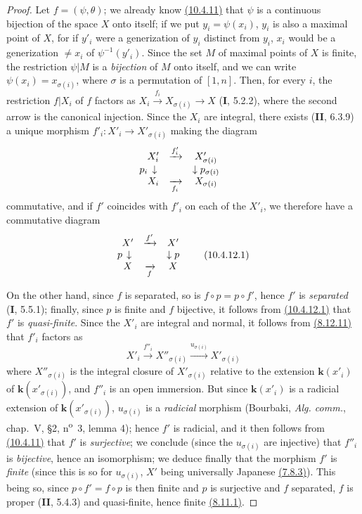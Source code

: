 \begin{proof}
Let $f=(\psi,\theta)$; we already know
{\hyperref[IV.10.4.11]{(10.4.11)}} that $\psi$ is a
continuous bijection of the space $X$ onto itself; if we put
$y_i=\psi(x_i)$, $y_i$ is also a maximal point of $X$, for if $y'_i$
were a generization of $y_i$ distinct from $y_i$, $x_i$ would be a
generization $\neq x_i$ of $\psi^{-1}(y'_i)$. Since the set $M$
of maximal points of $X$ is finite, the restriction $\psi|M$ is a
\emph{bijection} of $M$ onto itself, and we can write
$\psi(x_i)=x_{\sigma(i)}$, where $\sigma$ is a permutation of
$[1,n]$. Then, for every $i$, the restriction $f|X_i$ of $f$
factors as $X_i\xrightarrow{f_i}X_{\sigma(i)}\longrightarrow X$
(\textbf{I}, 5.2.2), where the second arrow is the canonical injection. Since the
$X_i$ are integral, there exists (\textbf{II}, 6.3.9) a unique morphism
$f'_i:X'_i\to X'_{\sigma(i)}$ making the diagram
\[
\begin{array}{ccc}
X'_i&\xrightarrow{f'_i}&X'_{\sigma(i)}\\
\llap{$p_i$\,}\downarrow&&\downarrow p_{\sigma(i)}\\
X_i&\xrightarrow[f_i]{}&X_{\sigma(i)}
\end{array}
\]
commutative, and if $f'$ coincides with $f'_i$ on each of the $X'_i$, we therefore have a
commutative diagram
\begin{equation}
\label{IV.10.4.12.1.errata}
\begin{array}{ccc}
X'&\xrightarrow{f'}&X'\\
\llap{$p$\,}\downarrow&&\downarrow p\\
X&\xrightarrow[f]{}&X
\end{array}
\tag{10.4.12.1}
\end{equation}

On the other hand, since $f$ is separated, so is
$f\circ p=p\circ f'$, hence $f'$ is \emph{separated} (\textbf{I}, 5.5.1); finally, since
$p$ is finite and $f$ bijective, it follows from
{\hyperref[IV.10.4.12.1]{(10.4.12.1)}} that $f'$ is
\emph{quasi-finite}. Since the $X'_i$ are integral and normal, it follows from
{\hyperref[IV.8.12.11]{(8.12.11)}} that $f'_i$ factors as
\[
 X'_i\xrightarrow{f''_i}X''_{\sigma(i)}
 \xrightarrow{u_{\sigma(i)}}X'_{\sigma(i)}
\]
where $X''_{\sigma(i)}$ is the integral closure of
$X'_{\sigma(i)}$ relative to the extension $\boldsymbol{k}(x'_i)$ of
$\boldsymbol{k}(x'_{\sigma(i)})$, and $f''_i$ is an open immersion. But since
$\boldsymbol{k}(x'_i)$ is a radicial extension of $\boldsymbol{k}(x'_{\sigma(i)})$,
$u_{\sigma(i)}$ is a \emph{radicial} morphism (Bourbaki,
\emph{Alg. comm.}, chap.~V, \S2, n\textsuperscript{o}~3, lemma 4);
hence $f'$ is radicial, and it then follows from
{\hyperref[IV.10.4.11]{(10.4.11)}} that $f'$ is
\emph{surjective}; we conclude (since the $u_{\sigma(i)}$ are injective)
that $f''_i$ is \emph{bijective}, hence an isomorphism; we deduce finally that
the morphism $f'$ is \emph{finite} (since this is so for $u_{\sigma(i)}$,
$X'$ being universally Japanese
{\hyperref[IV.7.8.3]{(7.8.3)}}). This being so, since
$p\circ f'=f\circ p$ is then finite and $p$ is surjective and $f$
separated, $f$ is proper (\textbf{II}, 5.4.3) and quasi-finite, hence finite
{\hyperref[IV.8.11.1]{(8.11.1)}}.


\end{proof}
